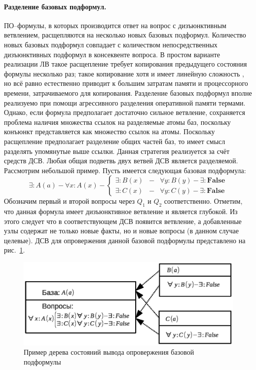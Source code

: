 \paragraph{Разделение базовых подформул.} ПО--формулы, в которых производится ответ на вопрос с дизъюнктивным ветвлением, расщепляются на несколько новых базовых подформул. Количество новых базовых подформул совпадает с количеством непосредственных дизъюнктивных подформул в консеквенте вопроса. В простом варианте реализации ЛВ \cite{dissChe} такое расщепление требует копирования предыдущего состояния формулы несколько раз; такое копирование хотя и имеет линейную сложность \cite{Che2}, но всё равно естественно приводит к большим затратам памяти и процессорного времени, затрачиваемого для копирования. Разделение базовых подформул вполне реализуемо при помощи агрессивного разделения оперативной памяти термами. Однако, если формула предполагает достаточно сильное ветвление, сохраняется проблема наличия множества ссылок на разделяемые атомы баз, поскольку конъюнкт представляется как множество ссылок на атомы. Поскольку расщепление предполагает разделение общих частей баз, то имеет смысл разделять упомянутые выше ссылки. Данная стратегия реализуется за счёт средств ДСВ. Любая общая подветвь двух ветвей ДСВ является разделяемой. Рассмотрим небольшой пример. Пусть имеется следующая базовая подформула:
$$\exists: A(a) - \forall x: A(x) - \left\{
\begin{array}{lcl}
 \exists \colon B(x) & - & \forall y: B(y) - \exists\colon\boldsymbol{False}\\
 \exists \colon C(x) & - & \forall y: C(y) - \exists\colon\boldsymbol{False}
\end{array}
\right. $$
Обозначим первый и второй вопросы через $Q_1$ и $Q_2$ соответственно. Отметим, что данная формула имеет дизъюнктивное ветвление и является глубокой. Из этого следует что в соответствующем ДСВ появится ветвление, а добавленные узлы содержат не только новые факты, но и новые вопросы (в данном случае целевые). ДСВ для опровержения данной базовой подформулы представлено на рис.~\ref{fig:datasharing2}.
\begin{figure}[h]
	\centering
	\includegraphics[width=0.7\linewidth]{pics/DataSharing2.eps}
	\caption{Пример дерева состояний вывода опровержения базовой подформулы}
	\label{fig:datasharing2}
\end{figure}

